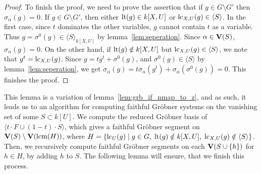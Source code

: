 \begin{proof}

  To finish the proof, we need to prove the assertion that if $g \in G \setminus G'$ then $\sigma_{\alpha}(g) = 0$. If $g \in G \setminus G'$, then either $\operatorname{lt}(g) \in k[X, U]$ or $\operatorname{lc}_{X, U}(g) \in \langle S \rangle $. In the first case, since $t$ dominates the other variables, $g$ cannot contain $t$ as a variable. Thus $g = \sigma^{0}(g) \in \langle S \rangle_{k[X, U]}$ by lemma~\ref{lem:seperation}. Since $\alpha \in \operatorname{\mathbf V}(S)$, $\sigma_{\alpha}(g) = 0$. On the other hand, if $\operatorname{lt}(g) \notin k[X, U]$ but $\operatorname{lc}_{X, U}(g) \in \langle S \rangle$, we note that $g^{t} = \operatorname{lc}_{X, U}(g)$. Since $g = tg^{t} + \sigma^{0}(g)$, and $\sigma^{0}(g) \in \langle S \rangle$ by lemma~\ref{lem:seperation}, we get $\sigma_{\alpha}(g) = t\sigma_{\alpha}(g^{t}) + \sigma_{\alpha}(\sigma^{0}(g)) = 0$. This finishes the proof.
\end{proof}

This lemma is a variation of lemma~\ref{lem:grb_if_nmap_to_z}, and as such, it leads us to an algorithm for computing faithful Gröbner systems on the vanishing set of some $S \subset k[U]$. We compute the reduced Gröbner basis of $\langle t\cdot F \cup (1-t)\cdot S \rangle$, which gives a faithful Gröbner segment on $\operatorname{\mathbf V}(S) \setminus \operatorname{\mathbf V}(\operatorname{lcm}(H))$, where $H = \{\operatorname{lc}_{U}(g) \mid g \in G,\; \operatorname{lt}(g) \notin k[X, U],\; \operatorname{lc}_{X, U}(g) \notin \langle S \rangle\}$. Then, we recursively compute faithful Gröbner segments on each $\operatorname{\mathbf V}(S \cup \{h\})$ for $h \in H$, by adding $h$ to $S$. The following lemma will ensure, that we finish this process.

